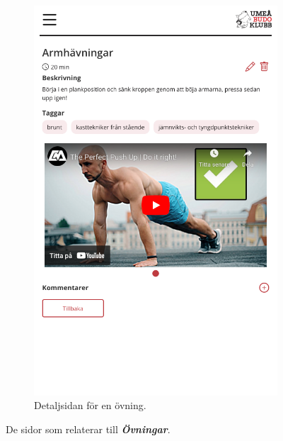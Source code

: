 \documentclass{article}
\newcommand{\term}[1]{\textcolor{secondary}{\textit{\textbf{#1}}}}
\begin{document}
{\begin{figure}[h!]
{\begin{subfigure}[b]{0.3\textwidth}
                 \includegraphics[width=\textwidth]{images/Screens/ExerciseDetail.png}
                 \caption{Detaljsidan för en övning.}
                 \label{fig:exerciseDetail}
            \end{subfigure}
            }
        \caption{De sidor som relaterar till \term{Övningar}.}
        \label{fig:exerciseFig}
    \end{figure}

    \newpage
}
\end{document}
